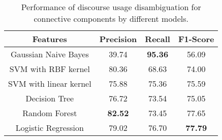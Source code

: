 \begin{table}[h]
\centering
\begin{tabular}{|c|c|c|c|}
\hline

\bf Features               & \bf Precision & \bf Recall & \bf F1-Score \\ \hline
    Gaussian Naive Bayes   &     39.74     & \bf 95.36  &     56.09    \\ \hline
    SVM with RBF kernel    &     80.36     &     68.63  &     74.00    \\ \hline
    SVM with linear kernel &     75.88     &     75.36  &     75.59    \\ \hline
    Decision Tree          &     76.72     &     73.54  &     75.05    \\ \hline
    Random Forest          & \bf 82.52     &     73.45  &     77.65    \\ \hline
    Logistic Regression    &     79.02     &     76.70  & \bf 77.79    \\ \hline

\end{tabular}
\caption{\label{t:recognition-models} Performance of discourse usage
disambiguation for connective components by different models. }
\end{table}
